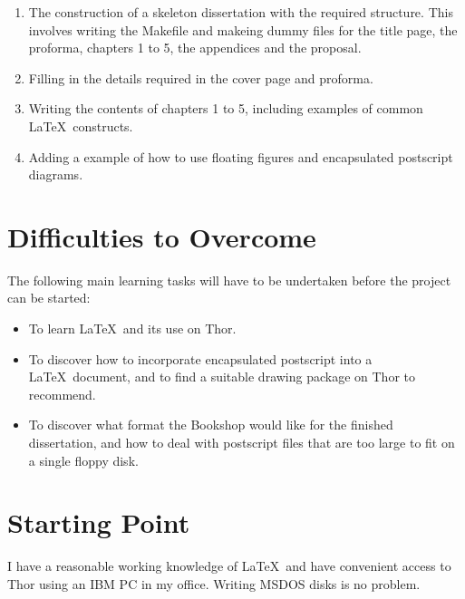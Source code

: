 \begin{enumerate}

\item The construction of a skeleton dissertation with the required 
structure. This involves writing the Makefile and makeing dummy files
for the title page, the proforma, chapters 1 to 5, the appendices and
the proposal.

\item Filling in the details required in the cover page and proforma.

\item Writing the contents of chapters 1 to 5, including examples
of common \LaTeX\ constructs.

\item Adding a example of how to use floating figures and encapsulated
postscript diagrams.

\end{enumerate}

\section*{Difficulties to Overcome}

The following main learning tasks will have to be undertaken before 
the project can be started:

\begin{itemize}

\item To learn \LaTeX\ and its use on Thor.

\item To discover how to incorporate encapsulated postscript into
a \LaTeX\ document, and to find a suitable drawing package on Thor
to recommend.

\item To discover what format the Bookshop would like for the finished
dissertation, and how to deal with postscript files that are too
large to fit on a single floppy disk.

\end{itemize}



\section*{Starting Point}

I have a reasonable working knowledge of \LaTeX\ and have convenient
access to Thor using an IBM PC in my office. Writing MSDOS disks is no 
problem.

